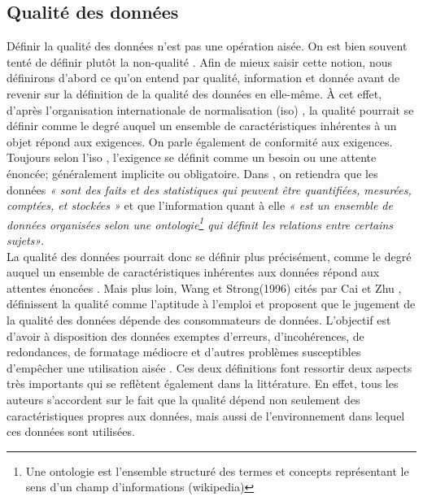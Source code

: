 


\subsection{Qualit\'e des donn\'ees}
Définir la qualité des données n’est pas une op\'eration ais\'ee. On est bien souvent tent\'e de définir plut\^ot la non-qualité \cite{pwc_micro_ebg_2011}. Afin de mieux saisir cette notion, nous d\'efinirons d'abord ce qu'on entend par qualit\'e, information et donn\'ee avant de revenir sur la d\'efinition de la qualit\'e des donn\'ees en elle-m\^eme. \`A cet effet, d'apr\`es l'organisation internationale de normalisation (\acrfull{iso}) \cite{Iso8000}, la  qualit\'e pourrait se d\'efinir comme le degré auquel un ensemble de caractéristiques inhérentes à un objet répond aux exigences. On parle \'egalement de conformit\'e aux exigences. Toujours selon l'\acrshort{iso} \cite{Iso8000}, l'exigence se d\'efinit comme un besoin ou une attente énoncée; généralement implicite ou obligatoire. 
Dans \cite{pwc_micro_ebg_2011}, on retiendra que les donn\'ees \emph{« sont des faits et des statistiques qui peuvent être quantifiées, mesurées, comptées, et stockées »} et que l'information quant \`a elle \emph{« est un ensemble de données organisées selon une ontologie\footnote{Une ontologie est l'ensemble structuré des termes et concepts représentant le sens d’un champ d'informations (wikipedia)} qui définit les relations entre certains sujets»}.\\

La qualit\'e des donn\'ees pourrait donc se d\'efinir plus précisément, comme le degré auquel un ensemble de caractéristiques inhérentes aux données répond aux attentes énoncées \cite{Iso8000}. Mais plus loin, Wang et Strong(1996) cit\'es par Cai et Zhu \cite{Cai_Zhu_2015},  d\'efinissent la qualit\'e comme l'aptitude \`a l'emploi et proposent que le jugement de la qualité des données dépende des consommateurs de données. L'objectif est d'avoir \`a disposition des donn\'ees exemptes d'erreurs, d'incohérences, de redondances, de formatage médiocre et d'autres problèmes susceptibles d'empêcher une utilisation aisée \cite{PreciselyDQ}. Ces deux d\'efinitions font ressortir deux aspects tr\`es importants qui se reflètent \'egalement dans la litt\'erature. En effet, tous les auteurs s'accordent sur le fait que la qualit\'e dépend non seulement des caractéristiques propres aux donn\'ees, mais aussi de l'environnement dans lequel ces donn\'ees sont utilis\'ees.
\\

